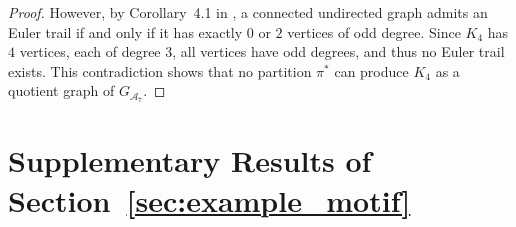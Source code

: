 \documentclass[12pt]{article}
\newcommand{\libref}[2]{\href{#2}{\texttt{#1}}}
\def\package{\libref{u-stats}{https://github.com/zrq1706/U-Statistics-Python}}
\theoremstyle{plain}
\theoremstyle{definition}
\def\Einsum{\textsc{Einsum}}
\newcommand{\completegraphp}[1]{K_{#1}}
\newcommand{\graphform}[1]{G_{#1}}
\newcommand{\Lin}[1]{{\color{purple}{#1}}}
\def\package{\libref{u-stats}{https://github.com/zrq1706/U-Statistics-Python}}
\def\calA{\mathcal{A}}
\def\calH{\mathcal{H}}
\begin{document}
\begin{bibunit}[agsm]
\begin{proof}
However, by Corollary~4.1 in \citet{bondy1976graph},  
a connected undirected graph admits an Euler trail if and only if it has exactly $0$ or $2$ vertices of odd degree.  
Since $\completegraphp{4}$ has $4$ vertices, each of degree $3$, all vertices have odd degrees, and thus no Euler trail exists.  
This contradiction shows that no partition $\pi^*$ can produce $\completegraphp{4}$ as a quotient graph of $\graphform{\calA_7}$.
\end{proof}







\section{Supplementary Results of Section~\ref{sec:example_motif}}
\label{app:motifs}


\end{bibunit}
\end{document}
